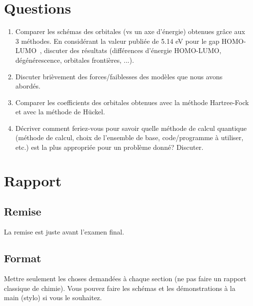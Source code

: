 \documentclass[12pt,letterpaper]{article}
\begin{document}
\section*{Questions}
\begin{enumerate}[resume]
\item Comparer les schémas des orbitales (vs un axe d'énergie) obtenues grâce aux 3 méthodes. En considérant la valeur publiée de 5.14 eV pour le gap HOMO-LUMO~\cite{doi:10.1021/om00036a047}, discuter des résultats (différences d'énergie HOMO-LUMO, dégénérescence, orbitales frontières, ...).
\item Discuter brièvement des forces/faiblesses des modèles que nous avons abordés.
\item Comparer les coefficients des orbitales obtenues avec la méthode Hartree-Fock et avec la méthode de Hückel.
\item Décriver comment feriez-vous pour savoir quelle méthode de calcul quantique (méthode de calcul, choix de l'ensemble de base, code/programme à utiliser, etc.) est la plus appropriée pour un problème donné? Discuter.
\end{enumerate}

\section*{Rapport}
\subsection*{Remise}
La remise est juste avant l'examen final.
\subsection*{Format}
Mettre seulement les choses demandées à chaque section (ne pas faire un rapport classique de chimie). Vous pouvez faire les schémas et les démonstrations à la main (stylo) si vous le souhaitez.

\nocite{*}
\printbibliography[]
\end{document}
